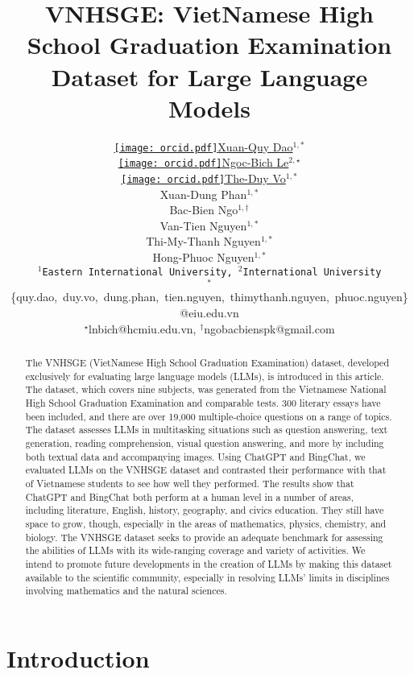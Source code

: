 \documentclass{article}
\title{VNHSGE: VietNamese High School Graduation Examination Dataset for Large Language Models
}
\author{ \href{https://orcid.org/0000-0001-5415-7538}{\texttt{[image: orcid.pdf]}\hspace{1mm}Xuan-Quy Dao$^{1,\ast}$} \\
\And
	\href{https://orcid.org/0000-0001-7431-0157}{\texttt{[image: orcid.pdf]}\hspace{1mm}Ngoc-Bich Le$^{2,\star}$}\\
\And
	\href{https://orcid.org/0009-0005-0237-0878}{\texttt{[image: orcid.pdf]}\hspace{1mm}The-Duy Vo$^{1,\ast}$}\\
\And
	Xuan-Dung Phan$^{1,\ast}$\\
\AND
	Bac-Bien Ngo$^{1,\dagger}$\\
\And
	Van-Tien Nguyen$^{1,\ast}$\\
\And
	Thi-My-Thanh Nguyen$^{1,\ast}$\\
\And
	Hong-Phuoc Nguyen$^{1,\ast}$\\
\And
	\texttt{$^{1}$Eastern International University,~$^{2}$International University}\\
	$^{\ast}$\{quy.dao,~duy.vo,~dung.phan,~tien.nguyen,~thimythanh.nguyen,~phuoc.nguyen\}@eiu.edu.vn \\
	$^{\star}$lnbich@hcmiu.edu.vn, $^{\dagger}$ngobacbienspk@gmail.com 
}
\begin{document}
	\maketitle


	
	\begin{abstract}
		
		The VNHSGE (VietNamese High School Graduation Examination) dataset, developed exclusively for evaluating large language models (LLMs), is introduced in this article. The dataset, which covers nine subjects, was generated from the Vietnamese National High School Graduation Examination and comparable tests. 300 literary essays have been included, and there are over 19,000 multiple-choice questions on a range of topics. The dataset assesses LLMs in multitasking situations such as question answering, text generation, reading comprehension, visual question answering, and more by including both textual data and accompanying images. Using ChatGPT and BingChat, we evaluated LLMs on the VNHSGE dataset and contrasted their performance with that of Vietnamese students to see how well they performed. The results show that ChatGPT and BingChat both perform at a human level in a number of areas, including literature, English, history, geography, and civics education. They still have space to grow, though, especially in the areas of mathematics, physics, chemistry, and biology. The VNHSGE dataset seeks to provide an adequate benchmark for assessing the abilities of LLMs with its wide-ranging coverage and variety of activities. We intend to promote future developments in the creation of LLMs by making this dataset available to the scientific community, especially in resolving LLMs' limits in disciplines involving mathematics and the natural sciences. 
		
	\end{abstract}
	
		
	\section{Introduction}
	
\end{document}
